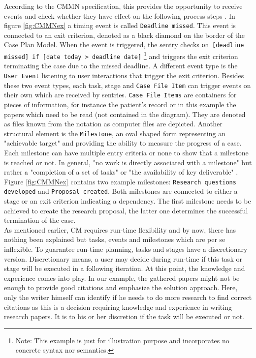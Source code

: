 According to the CMMN specification, this provides the opportunity to receive events and check whether they have effect on the following process steps \cite{CMMNspec2014}. In figure \ref{fig:CMMNex} a timing event is called \texttt{Deadline missed}. This event is connected to an exit criterion, denoted as a black diamond on the border of the Case Plan Model. When the event is triggered, the sentry checks \texttt{on [deadline missed] if [date today > deadline date]} \footnote{Note: This example is just for illustration purpose and incorporates no concrete syntax nor semantics.} and triggers the exit criterion terminating the case due to the missed deadline. A different event type is the \texttt{User Event} listening to user interactions that trigger the exit criterion. Besides these two event types, each task, stage and \texttt{Case File Item} can trigger events on their own which are received by sentries. \texttt{Case File Items} are containers for pieces of information, for instance the patient's record or in this example the papers which need to be read (not contained in the diagram). They are denoted as files known from the notation as computer files are depicted.
Another structural element is the \texttt{Milestone}, an oval shaped form representing an "achievable target" \cite{CMMNspec2014} and providing the ability to measure the progress of a case. Each milestone can have multiple entry criteria or none to show that a milestone is reached or not. In general, "no work is directly associated with a milestone" \cite{CMMNspec2014} but rather a "completion of a set of tasks" or "the availability of key deliverable" \cite{CMMNspec2014}. Figure \ref{fig:CMMNex} contains two example milestones: \texttt{Research questions developed} and \texttt{Proposal created}. Both milestones are connected to either a stage or an exit criterion indicating a dependency. The first milestone needs to be achieved to create the research proposal, the latter one determines the successful termination of the case. \\
As mentioned earlier, CM requires run-time flexibility and by now, there has nothing been explained but tasks, events and milestones which are per se inflexible. To guarantee run-time planning, tasks and stages have a discretionary version. Discretionary means, a user may decide during run-time if this task or stage will be executed in a following iteration. At this point, the knowledge and experience comes into play. In our example, the gathered papers might not be enough to provide good citations and emphasize the solution approach. Here,  only the writer himself can identify if he needs to do more research to find correct citations as this is a decision requiring knowledge and experience in writing research papers. It is to his or her discretion if the task will be executed or not. 
